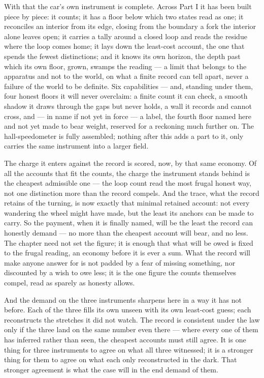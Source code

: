 With that the car's own instrument is complete. Across Part I it has been built piece by piece: it counts; it
has a floor below which two states read as one; it reconciles an interior from its edge, closing from the
boundary a fork the interior alone leaves open; it carries a tally around a closed loop and reads the residue
where the loop comes home; it lays down the least-cost account, the one that spends the fewest distinctions;
and it knows its own horizon, the depth past which its own floor, grown, swamps the reading --- a limit that
belongs to the apparatus and not to the world, on what a finite record can tell apart, never a failure of the
world to be definite. Six capabilities --- and, standing under them, four honest floors it will never
overclaim: a finite count it can check, a smooth shadow it draws through the gaps but never holds, a wall it
records and cannot cross, and --- in name if not yet in force --- a label, the fourth floor named here and not
yet made to bear weight, reserved for a reckoning much further on. The hall-speedometer is fully assembled;
nothing after this adds a part to it, only carries the same instrument into a larger field.

The charge it enters against the record is scored, now, by that same economy. Of all the accounts that fit the
counts, the charge the instrument stands behind is the cheapest admissible one --- the loop count read the most
frugal honest way, not one distinction more than the record compels. And the trace, what the record retains of
the turning, is now exactly that minimal retained account: not every wandering the wheel might have made, but
the least its anchors can be made to carry. So the payment, when it is finally named, will be the least the
record can honestly demand --- no more than the cheapest account will bear, and no less. The chapter need not
set the figure; it is enough that what will be owed is fixed to the frugal reading, an economy before it is
ever a sum. What the record will make anyone answer for is not padded by a fear of missing something, nor
discounted by a wish to owe less; it is the one figure the counts themselves compel, read as sparely as
honesty allows.

And the demand on the three instruments sharpens here in a way it has not before. Each of the three fills its
own unseen with its own least-cost guess; each reconstructs the stretches it did not watch. The record is
consistent under the law only if the three land on the same number even there --- where every one of them has
inferred rather than seen, the cheapest accounts must still agree. It is one thing for three instruments to
agree on what all three witnessed; it is a stronger thing for them to agree on what each only reconstructed in
the dark. That stronger agreement is what the case will in the end demand of them.

